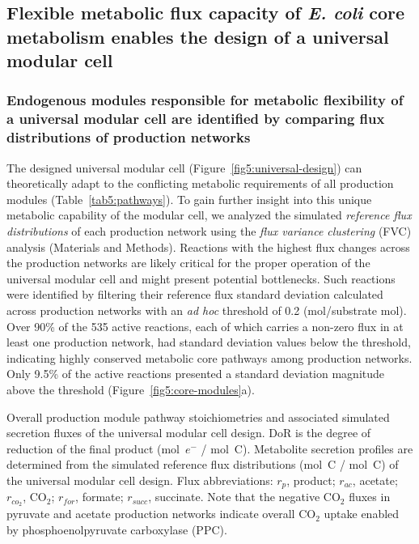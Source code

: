 \subsection{Flexible metabolic flux capacity of \textit{E. coli} core metabolism enables the design of a universal modular cell}

\subsubsection{Endogenous modules responsible for metabolic flexibility of a universal modular cell are identified by comparing flux distributions of production networks}
The designed universal modular cell (Figure~\ref{fig5:universal-design}) can theoretically adapt to the conflicting metabolic requirements of all production modules (Table~\ref{tab5:pathways}).
To gain further insight into this unique metabolic capability of the modular cell, we analyzed the simulated \emph{reference flux distributions} of each production network using the \emph{flux variance clustering} (FVC) analysis (Materials and Methods).
Reactions with the highest flux changes across the production networks are likely critical for the proper operation of the universal modular cell and might present potential bottlenecks.
Such reactions were identified by filtering their reference flux standard deviation calculated across production networks with an \textit{ad hoc} threshold of 0.2 (mol/substrate mol).
Over 90\% of the 535 active reactions, each of which carries a non-zero flux in at least one production network, had standard deviation values below the threshold, indicating  highly conserved metabolic core pathways among production networks. Only 9.5\% of the active reactions presented a standard deviation magnitude above the threshold (Figure~\ref{fig5:core-modules}a).


\begin{table}[ht]
    \caption[Overall production module pathway stoichiometries and associated simulated secretion fluxes of the universal modular cell design]{Overall production module pathway stoichiometries and associated simulated secretion fluxes of the universal modular cell design.
    DoR is the degree of reduction of the final product (mol~$e^-$ / mol~C). Metabolite secretion profiles are determined from the simulated reference flux distributions (mol~C / mol~C) of the universal modular cell design.
    Flux abbreviations: $r_{p}$, product; $r_{ac}$, acetate; $r_{co_2}$, CO$_2$; $r_{for}$, formate; $r_{succ}$, succinate.
    Note that the negative CO$_2$ fluxes in pyruvate and acetate production networks indicate overall CO$_2$ uptake enabled by phosphoenolpyruvate carboxylase (PPC).}
    \centering
 	
    \label{tab5:pathways}
\end{table}


